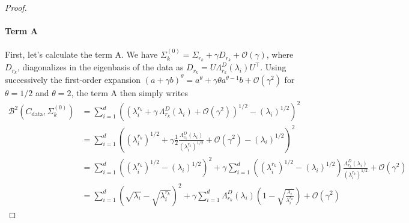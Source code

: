 \documentclass[11pt]{article}
\begin{document}
\begin{proof}
\paragraph{Term A}
First, let's calculate the term A. We have $\Sigma^{(0)}_k = \Sigma_{r_k} + \gamma D_{r_k} + \mathcal{O}(\gamma)$, 
where $D_{r_k}$, diagonalizes in the eigenbasis of the data as $D_{r_k} = U \Lambda^{D}_{r_k}(\lambda_i)U^\top$.
Using successively the first-order expansion $(a + \gamma b)^{\theta} = a^{\theta} + \gamma\theta a^{\theta-1} b + \mathcal{O}(\gamma^2)$ for $\theta = 1/2$ and $\theta =2$, the term A then simply writes 
\begin{align*}
\mathcal{B}^2(C_\mathrm{data}, \Sigma^{(0)}_k) &= \sum_{i=1}^d \left( \left(\lambda^{r_k}_i + \gamma \,\Lambda^{D}_{r_k}(\lambda_i) + \mathcal{O}(\gamma^2) \right)^{1/2} - (\lambda_i)^{1/2} \right)^2 \\
&=  \sum_{i=1}^d \left( \left(\lambda^{r_k}_i\right)^{1/2} + \gamma  \frac{1}{2} \frac{\Lambda^{D}_{r_k}(\lambda_i)}{(\lambda^{r_k}_i)^{1/2}} + \mathcal{O}(\gamma^2) - (\lambda_i)^{1/2} \right)^2 \\
&= \sum_{i=1}^d \left( \left(\lambda^{r_k}_i\right)^{1/2} - (\lambda_i)^{1/2}  \right)^2 + \gamma \sum_{i=1}^d  \left((\lambda^{r_k}_i)^{1/2}  - (\lambda_i)^{1/2} \right) \frac{\Lambda^{D}_{r_k}(\lambda_i)}{(\lambda^{r_k}_i)^{1/2}} + \mathcal{O}(\gamma^2)\\
&= \sum_{i=1}^d \left(\sqrt{\lambda_i} - \sqrt{\lambda^{r_k}_i} \right)^2 + \gamma \sum_{i=1}^d\Lambda^{D}_{r_k}(\lambda_i) \left( 1 - \sqrt{\frac{\lambda_i}{\lambda^{r_k}_i}} \right) + \mathcal{O}(\gamma^2)
\end{align*}

\end{proof}
\end{document}
